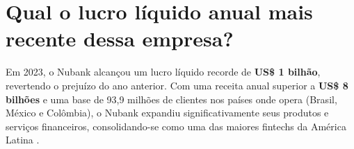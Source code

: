 \section{Qual o lucro líquido anual mais recente dessa empresa?}

Em 2023, o Nubank alcançou um lucro líquido recorde de \textbf{US\$ 1 bilhão}, revertendo o prejuízo do ano anterior. Com uma receita anual superior a \textbf{US\$ 8 bilhões} e uma base de 93,9 milhões de clientes nos países onde opera (Brasil, México e Colômbia), o Nubank expandiu significativamente seus produtos e serviços financeiros, consolidando-se como uma das maiores fintechs da América Latina \cite{nubank2023resultados}.

